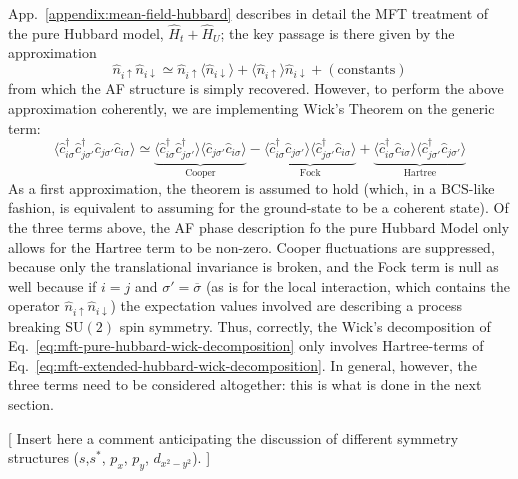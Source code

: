 App.~\ref{appendix:mean-field-hubbard} describes in detail the MFT treatment of the pure Hubbard model, $\hat H_t + \hat H_U$; the key passage is there given by the approximation
\begin{equation}\label{eq:mft-pure-hubbard-wick-decomposition}
	\hat n_{i\uparrow} \hat n_{i\downarrow} \simeq \hat n_{i\uparrow} \langle \hat n_{i\downarrow} \rangle + \langle \hat n_{i\uparrow} \rangle \hat n_{i\downarrow} + (\mathrm{constants})
\end{equation}
from which the AF structure is simply recovered. However, to perform the above approximation coherently, we are implementing Wick's Theorem on the generic term:
\begin{equation}\label{eq:mft-extended-hubbard-wick-decomposition}
	\langle
		\hat c_{i\sigma}^\dagger \hat c_{j\sigma'}^\dagger \hat c_{j\sigma'} \hat c_{i\sigma}
	\rangle \simeq \underbrace{
		\langle 
			\hat c_{i\sigma}^\dagger \hat c_{j\sigma'}^\dagger
		\rangle \langle	
			\hat c_{j\sigma'} \hat c_{i\sigma} 
		\rangle 
	}_{\text{Cooper}}
	- 
	\underbrace{
		\langle 
			\hat c_{i\sigma}^\dagger \hat c_{j\sigma'}
		\rangle \langle	
			\hat c_{j\sigma'}^\dagger \hat c_{i\sigma} 
		\rangle 
	}_{\text{Fock}}
	+ 
	\underbrace{
		\langle 
		\hat c_{i\sigma}^\dagger \hat c_{i\sigma}
		\rangle \langle	
		\hat c_{j\sigma'}^\dagger \hat c_{j\sigma'} 
		\rangle
	}_{\text{Hartree}}
\end{equation}
As a first approximation, the theorem is assumed to hold (which, in a $\mathrm{BCS}$-like fashion, is equivalent to assuming for the ground-state to be a coherent state). Of the three terms above, the AF phase description fo the pure Hubbard Model only allows for the Hartree term to be non-zero. Cooper fluctuations are suppressed, because only the translational invariance is broken, and the Fock term is null as well because if $i=j$ and $\sigma'=\overline{\sigma}$ (as is for the local interaction, which contains the operator $\hat n_{i\uparrow} \hat n_{i\downarrow}$) the expectation values involved are describing a process breaking $\mathrm{SU}(2)$ spin symmetry. Thus, correctly, the Wick's decomposition of Eq.~\eqref{eq:mft-pure-hubbard-wick-decomposition} only involves Hartree-terms of Eq.~\eqref{eq:mft-extended-hubbard-wick-decomposition}. In general, however, the three terms need to be considered altogether: this is what is done in the next section.

{\color{tabred}[
	Insert here a comment anticipating the discussion of different symmetry structures ($s$,$s^*$, $p_x$, $p_y$, $d_{x^2-y^2}$).
]}

